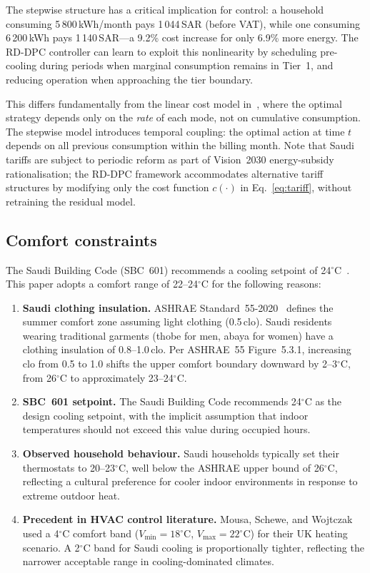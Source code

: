 \documentclass[12pt]{article}
\theoremstyle{plain}
\theoremstyle{definition}
\begin{document}
The stepwise structure has a critical implication for control: a household consuming 5\,800\,kWh/month pays 1\,044\,SAR (before VAT), while one consuming 6\,200\,kWh pays 1\,140\,SAR---a 9.2\% cost increase for only 6.9\% more energy. The RD-DPC controller can learn to exploit this nonlinearity by scheduling pre-cooling during periods when marginal consumption remains in Tier~1, and reducing operation when approaching the tier boundary.

This differs fundamentally from the linear cost model in~\cite{mousa2018optimal}, where the optimal strategy depends only on the \emph{rate} of each mode, not on cumulative consumption. The stepwise model introduces temporal coupling: the optimal action at time $t$ depends on all previous consumption within the billing month. Note that Saudi tariffs are subject to periodic reform as part of Vision~2030 energy-subsidy rationalisation; the RD-DPC framework accommodates alternative tariff structures by modifying only the cost function $c(\cdot)$ in Eq.~\ref{eq:tariff}, without retraining the residual model.

\subsection{Comfort constraints}\label{sec:comfort}

The Saudi Building Code (SBC~601) recommends a cooling setpoint of 24$^\circ$C~\cite{sbc601}. This paper adopts a comfort range of 22--24$^\circ$C for the following reasons:

\begin{enumerate}[leftmargin=*, nosep]
\item \textbf{Saudi clothing insulation.} ASHRAE Standard~55-2020~\cite{ashrae55} defines the summer comfort zone assuming light clothing (0.5\,clo). Saudi residents wearing traditional garments (thobe for men, abaya for women) have a clothing insulation of 0.8--1.0\,clo. Per ASHRAE~55 Figure~5.3.1, increasing clo from 0.5 to 1.0 shifts the upper comfort boundary downward by 2--3$^\circ$C, from 26$^\circ$C to approximately 23--24$^\circ$C.
\item \textbf{SBC~601 setpoint.} The Saudi Building Code recommends 24$^\circ$C as the design cooling setpoint, with the implicit assumption that indoor temperatures should not exceed this value during occupied hours.
\item \textbf{Observed household behaviour.} Saudi households typically set their thermostats to 20--23$^\circ$C, well below the ASHRAE upper bound of 26$^\circ$C, reflecting a cultural preference for cooler indoor environments in response to extreme outdoor heat.
\item \textbf{Precedent in HVAC control literature.} Mousa, Schewe, and Wojtczak~\cite{mousa2018optimal} used a 4$^\circ$C comfort band ($V_{\min} = 18^\circ$C, $V_{\max} = 22^\circ$C) for their UK heating scenario. A 2$^\circ$C band for Saudi cooling is proportionally tighter, reflecting the narrower acceptable range in cooling-dominated climates.
\end{enumerate}
\end{document}
